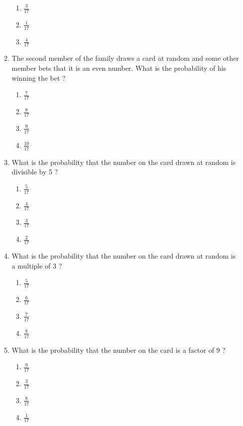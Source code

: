 \begin{enumerate}
\begin{enumerate}
\begin{enumerate}
	\item $\frac{3}{17}$
	\item $\frac{1}{17}$ 
	\item $\frac{4}{17}$ 
	\end{enumerate}
\item The second member of the family draws a card at random and some other member bets that it is an even number. What is the probability of his winning the bet ? 
	\begin{enumerate}
	\item $\frac{7}{17}$
	\item $\frac{8}{17}$
	\item $\frac{9}{17}$ 
	\item $\frac{10}{17}$ 
	\end{enumerate}
\item What is the probability that the number on the card drawn at random is divisible by 5 ? 
	\begin{enumerate}
	\item $\frac{5}{17}$
	\item $\frac{4}{17}$
	\item $\frac{3}{17}$ 
	\item $\frac{2}{17}$ 
	\end{enumerate}
\item What is the probability that the number on the card drawn at random is a multiple of 3 ? 
	\begin{enumerate}
	\item $\frac{5}{17}$
	\item $\frac{6}{17}$
	\item $\frac{7}{17}$ 
	\item $\frac{8}{17}$ 
	\end{enumerate}
\item What is the probability that the number on the card is a factor of 9 ?
	\begin{enumerate}
	\item $\frac{9}{17}$
	\item $\frac{3}{17}$
	\item $\frac{8}{17}$ 
	\item $\frac{1}{17}$ 
	\end{enumerate}
\end{enumerate}
		


\end{enumerate}
